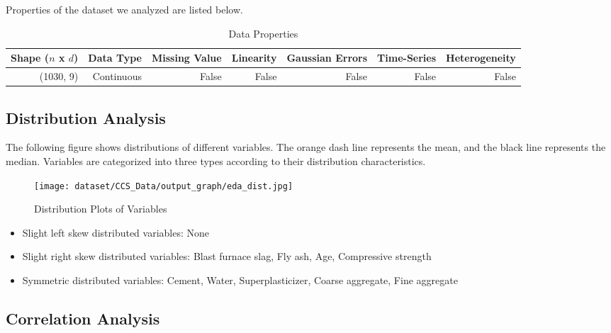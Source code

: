 \documentclass{article}
\begin{document}
Properties of the dataset we analyzed are listed below.

\begin{table}[H]
    \centering
    \caption{Data Properties}

    \begin{tabular}{rrrrrrr}
    \toprule
    Shape ($n$ x $d$) & Data Type & Missing Value & Linearity & Gaussian Errors & Time-Series & Heterogeneity \\
    \midrule
    (1030, 9)   & Continuous & False & False & False & False & False \\
    \bottomrule
    \end{tabular}
        
\end{table}


\subsection{Distribution Analysis}
The following figure shows distributions of different variables. The orange dash line represents the mean, 
and the black line represents the median. Variables are categorized into three types according to their distribution characteristics.

\begin{figure}[H]
\centering
\texttt{[image: dataset/CCS\_Data/output\_graph/eda\_dist.jpg]}
\caption{\label{fig:dist}Distribution Plots of Variables}
\end{figure}

\begin{itemize}
\item Slight left skew distributed variables: None
\item Slight right skew distributed variables: Blast furnace slag, Fly ash, Age, Compressive strength
\item Symmetric distributed variables: Cement, Water, Superplasticizer, Coarse aggregate, Fine aggregate
\end{itemize}

\subsection{Correlation Analysis}
\end{document}
